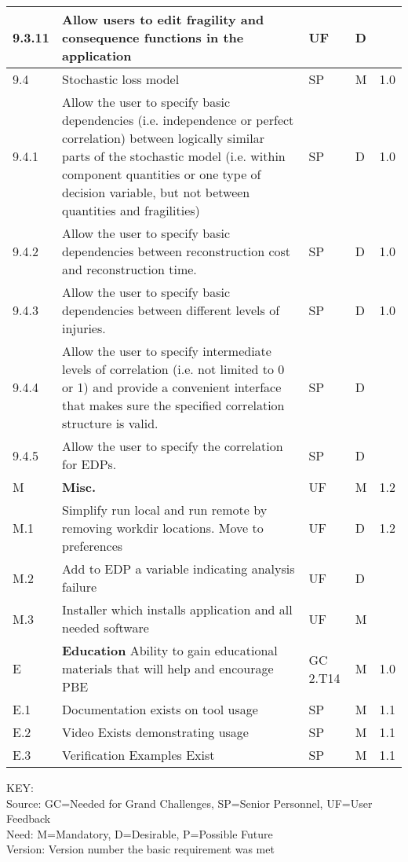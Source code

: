 \begin{longtable}{| p{} | p{} | p{} | p{} |  p{} |}
9.3.11 & Allow users to edit fragility and consequence functions in the application & UF & D &  \\ \hline
9.4 & Stochastic loss model & SP & M & 1.0 \\ \hline
9.4.1 & Allow the user to specify basic dependencies (i.e. independence or perfect correlation) between logically similar parts of the stochastic model (i.e. within component quantities or one type of decision variable, but not between quantities and fragilities) & SP & D & 1.0 \\ \hline
9.4.2 & Allow the user to specify basic dependencies between reconstruction cost and reconstruction time. & SP & D & 1.0 \\ \hline
9.4.3 & Allow the user to specify basic dependencies between different levels of injuries. & SP & D & 1.0 \\ \hline
9.4.4 & Allow the user to specify intermediate levels of correlation (i.e. not limited to 0 or 1) and provide a convenient interface that makes sure the specified correlation structure is valid. & SP & D & \\ \hline   
9.4.5 & Allow the user to specify the correlation for EDPs. & SP & D &  \\ \hline  

 M & \textbf{Misc.} & UF & M & 1.2  \\ \hline
   M.1 & Simplify run local and run remote by removing workdir locations. Move to preferences & UF & D & 1.2  \\ \hline
   M.2 & Add to EDP a variable indicating analysis failure & UF & D &   \\ \hline
   M.3 & Installer which installs application and all needed software & UF & M &   \\ \hline
 E & \textbf{Education} Ability to gain educational materials that will help and encourage PBE &  GC 2.T14  & M & 1.0 \\ \hline
 E.1 & Documentation exists on tool usage & SP & M & 1.1  \\ \hline
 E.2 & Video Exists demonstrating usage & SP & M & 1.1  \\ \hline
 E.3 & Verification Examples Exist & SP & M & 1.1  \\ \hline
  \bottomrule               
\end{longtable}


\noindent
KEY:\\
Source: GC=Needed for Grand Challenges, SP=Senior Personnel, UF=User Feedback \\
Need: M=Mandatory, D=Desirable, P=Possible Future \\
Version: Version number the basic requirement was met 

